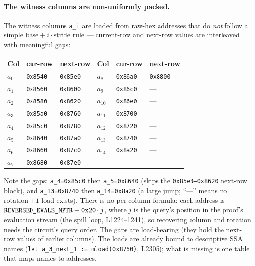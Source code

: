 \paragraph{The witness columns are non-uniformly packed.}
The witness columns \texttt{a\_i} are loaded from raw-hex
addresses that do \emph{not} follow a simple
$\text{base} + i\cdot\text{stride}$ rule --- current-row and
next-row values are interleaved with meaningful gaps:
\begin{center}\small
\begin{tabular}{@{}llllll@{}}
\toprule
\textbf{Col} & \textbf{cur-row} & \textbf{next-row} & \textbf{Col} & \textbf{cur-row} & \textbf{next-row} \\
\midrule
$a_0$ & \texttt{0x8540} & \texttt{0x85e0} & $a_8$  & \texttt{0x86a0} & \texttt{0x8800} \\
$a_1$ & \texttt{0x8560} & \texttt{0x8600} & $a_9$  & \texttt{0x86c0} & --- \\
$a_2$ & \texttt{0x8580} & \texttt{0x8620} & $a_{10}$ & \texttt{0x86e0} & --- \\
$a_3$ & \texttt{0x85a0} & \texttt{0x8760} & $a_{11}$ & \texttt{0x8700} & --- \\
$a_4$ & \texttt{0x85c0} & \texttt{0x8780} & $a_{12}$ & \texttt{0x8720} & --- \\
$a_5$ & \texttt{0x8640} & \texttt{0x87a0} & $a_{13}$ & \texttt{0x8740} & --- \\
$a_6$ & \texttt{0x8660} & \texttt{0x87c0} & $a_{14}$ & \texttt{0x8a20} & --- \\
$a_7$ & \texttt{0x8680} & \texttt{0x87e0} & & & \\
\bottomrule
\end{tabular}
\end{center}
Note the gaps: \texttt{a\_4=0x85c0} then \texttt{a\_5=0x8640}
(skips the \texttt{0x85e0--0x8620} next-row block), and
\texttt{a\_13=0x8740} then \texttt{a\_14=0x8a20} (a large jump;
``---'' means no rotation-$+1$ load exists).
There is no per-column formula: each address is
$\texttt{REVERSED\_\allowbreak{}EVALS\_\allowbreak{}MPTR} + \texttt{0x20}\cdot j$, where $j$
is the query's position in the proof's evaluation stream (the
spill loop, L1224--1241), so recovering column and rotation needs
the circuit's query order. The gaps are
load-bearing (they hold the next-row values of earlier columns).
The loads are already bound to descriptive SSA names
(\texttt{let a\_\allowbreak{}3\_\allowbreak{}next\_\allowbreak{}1 := mload(0x8760)}, L2305); what is
missing is one table that maps names to addresses.

